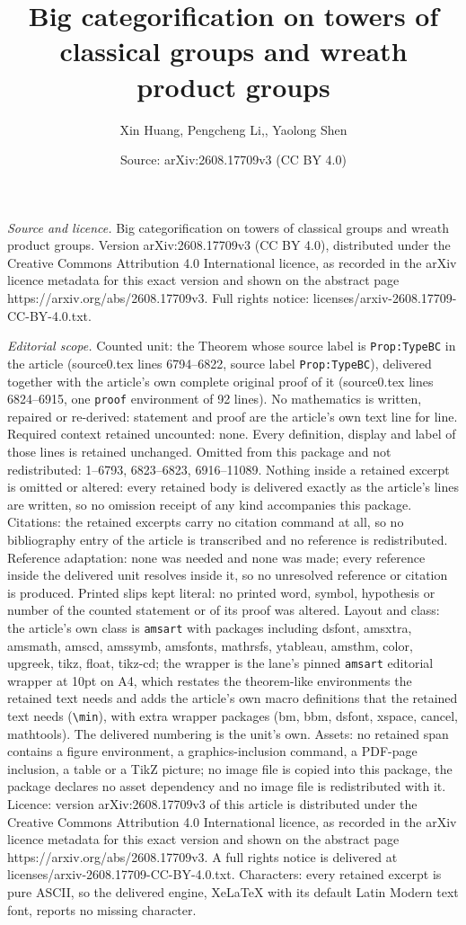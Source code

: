 \documentclass[10pt,a4paper]{amsart}
\title[Big categorification on towers of classical groups and wreat]{Big categorification on towers of classical groups and wreath product groups}
\author{Xin Huang, Pengcheng Li,, Yaolong Shen}
\date{Source: arXiv:2608.17709v3 (CC BY 4.0)}
\begin{document}
\maketitle

\noindent\emph{Source and licence.} Big categorification on towers of classical groups and wreath product groups. Version arXiv:2608.17709v3 (CC BY 4.0), distributed under the Creative Commons Attribution 4.0 International licence, as recorded in the arXiv licence metadata for this exact version and shown on the abstract page https://arxiv.org/abs/2608.17709v3. Full rights notice: licenses/arxiv-2608.17709-CC-BY-4.0.txt.\par\smallskip

\noindent\textit{Editorial scope.} Counted unit: the Theorem whose source label is \texttt{Prop:TypeBC} in the article (source0.tex lines 6794--6822, source label \texttt{Prop:TypeBC}), delivered together with the article's own complete original proof of it (source0.tex lines 6824--6915, one \texttt{proof} environment of 92 lines). No mathematics is written, repaired or re-derived: statement and proof are the article's own text line for line. Required context retained uncounted: none. Every definition, display and label of those lines is retained unchanged. Omitted from this package and not redistributed: 1--6793, 6823--6823, 6916--11089. Nothing inside a retained excerpt is omitted or altered: every retained body is delivered exactly as the article's lines are written, so no omission receipt of any kind accompanies this package. Citations: the retained excerpts carry no citation command at all, so no bibliography entry of the article is transcribed and no reference is redistributed. Reference adaptation: none was needed and none was made; every reference inside the delivered unit resolves inside it, so no unresolved reference or citation is produced. Printed slips kept literal: no printed word, symbol, hypothesis or number of the counted statement or of its proof was altered. Layout and class: the article's own class is \texttt{amsart} with packages including dsfont, amsxtra, amsmath, amscd, amssymb, amsfonts, mathrsfs, ytableau, amsthm, color, upgreek, tikz, float, tikz-cd; the wrapper is the lane's pinned \texttt{amsart} editorial wrapper at 10pt on A4, which restates the theorem-like environments the retained text needs and adds the article's own macro definitions that the retained text needs (\texttt{\textbackslash min}), with extra wrapper packages (bm, bbm, dsfont, xspace, cancel, mathtools). The delivered numbering is the unit's own. Assets: no retained span contains a figure environment, a graphics-inclusion command, a PDF-page inclusion, a table or a TikZ picture; no image file is copied into this package, the package declares no asset dependency and no image file is redistributed with it. Licence: version arXiv:2608.17709v3 of this article is distributed under the Creative Commons Attribution 4.0 International licence, as recorded in the arXiv licence metadata for this exact version and shown on the abstract page https://arxiv.org/abs/2608.17709v3. A full rights notice is delivered at licenses/arxiv-2608.17709-CC-BY-4.0.txt. Characters: every retained excerpt is pure ASCII, so the delivered engine, XeLaTeX with its default Latin Modern text font, reports no missing character.
\end{document}
